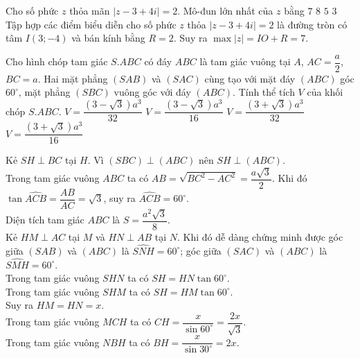 \begin{ex}%
 Cho số phức $z$ thỏa mãn $|z-3+4i|=2$. Mô-đun lớn nhất của $z$ bằng
 \choice
  {\True $7$}
  {$8$}
  {$5$}
  {$3$}
 \loigiai
  {
  Tập hợp các điểm biểu diễn cho số phức $z$ thỏa $|z-3+4i|=2$ là đường tròn có tâm $I(3;-4)$ và bán kính bằng $R=2$. Suy ra $\max |z|=IO+R=7.$
  }
\end{ex}

\begin{ex}%
 Cho hình chóp tam giác $S.ABC$ có đáy $ABC$ là tam giác vuông tại $A$, $AC=\dfrac{a}{2}$, $BC=a$. Hai mặt phẳng $(SAB)$ và $(SAC)$ cùng tạo với mặt đáy $(ABC)$ góc $60^\circ$, mặt phẳng $(SBC)$ vuông góc với đáy $(ABC)$. Tính thể tích $V$ của khối chóp $S.ABC$.
 \choice
  {\True $V=\dfrac{\left(3-\sqrt{3}\right)a^3}{32}$}
  {$V=\dfrac{\left(3-\sqrt{3}\right)a^3}{16}$}
  {$V=\dfrac{\left(3+\sqrt{3}\right)a^3}{32}$}
  {$V=\dfrac{\left(3+\sqrt{3}\right)a^3}{16}$}
 \loigiai
  {
  \immini
  {
  Kẻ $SH\perp BC$ tại $H$. Vì $(SBC)\perp(ABC)$ nên $SH\perp(ABC)$.\\
  Trong tam giác vuông $ABC$ ta có $AB=\sqrt{BC^2-AC^2}=\dfrac{a\sqrt{3}}{2}$. Khi đó $\tan\widehat{ACB}=\dfrac{AB}{AC}=\sqrt{3}$, suy ra $\widehat{ACB}=60^\circ$.\\
  Diện tích tam giác $ABC$ là $S=\dfrac{a^2\sqrt{3}}{8}$.\\
  Kẻ $HM\perp AC$ tại $M$ và $HN\perp AB$ tại $N$. Khi đó dễ dàng chứng minh được góc giữa $(SAB)$ và $(ABC)$ là $\widehat{SNH}=60^\circ$; góc giữa $(SAC)$ và $(ABC)$ là $\widehat{SMH}=60^\circ$.\\
  Trong tam giác vuông $SHN$ ta có $SH=HN\tan 60^\circ$.\\
  Trong tam giác vuông $SHM$ ta có $SH=HM\tan 60^\circ$.\\
  Suy ra $HM=HN=x$.\\
  Trong tam giác vuông $MCH$ ta có $CH=\dfrac{x}{\sin 60^\circ}=\dfrac{2x}{\sqrt{3}}$.\\
  Trong tam giác vuông $NBH$ ta có $BH=\dfrac{x}{\sin 30^\circ}=2x$.\\
  }
  {
  }}
\end{ex}
